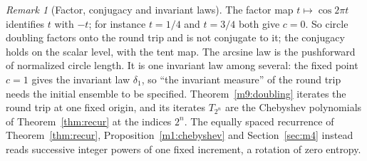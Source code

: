 \documentclass[11pt,reqno]{amsart}
\theoremstyle{definition}
\theoremstyle{remark}
\newtheorem{remark}[theorem]{Remark}
\numberwithin{equation}{section}
\begin{document}
\begin{remark}[Factor, conjugacy and invariant laws]\label{m9:circle-boundaries}
The factor map \(t\mapsto\cos2\pi t\) identifies \(t\) with \(-t\); for
instance \(t=1/4\) and \(t=3/4\) both give \(c=0\). So circle doubling
factors onto the round trip and is not conjugate to it; the conjugacy holds
on the scalar level, with the tent map. The arcsine law is the pushforward of
normalized circle length. It is one invariant law among several: the fixed
point \(c=1\) gives the invariant law \(\delta_1\), so ``the invariant
measure'' of the round trip needs the initial ensemble to be specified.
Theorem~\ref{m9:doubling} iterates the round trip at one fixed origin, and
its iterates \(T_{2^n}\) are the Chebyshev polynomials of
Theorem~\ref{thm:recur} at the indices \(2^n\). The equally spaced
recurrence of Theorem~\ref{thm:recur}, Proposition~\ref{m1:chebyshev} and
Section~\ref{sec:m4} instead reads successive integer powers of one fixed
increment, a rotation of zero entropy.
\end{remark}
\end{document}
